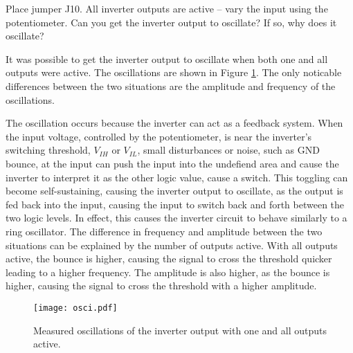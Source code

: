 \documentclass[../main.tex]{subfiles}
\begin{document}
\vspace{10pt}

Place jumper J10. All inverter outputs are active – vary the input using the potentiometer. Can you get the inverter output to oscillate? If so, why does it oscillate?

\solution

It was possible to get the inverter output to oscillate when both one and all outputs were active. The oscillations are shown in Figure \ref{fig:inverter_oscillation}. The only noticable differences between the two situations are the amplitude and frequency of the oscillations.

The oscillation occurs because the inverter can act as a feedback system. When the input voltage, controlled by the potentiometer, is near the inverter's switching threshold, $V_{IH}$ or $V_{IL}$, small disturbances or noise, such as GND bounce, at the input can push the input into the undefiend area and cause the inverter to interpret it as the other logic value, cause a switch. This toggling can become self-sustaining, causing the inverter output to oscillate, as the output is fed back into the input, causing the input to switch back and forth between the two logic levels. In effect, this causes the inverter circuit to behave similarly to a ring oscillator. The difference in frequency and amplitude between the two situations can be explained by the number of outputs active. With all outputs active, the bounce is higher, causing the signal to cross the threshold quicker leading to a higher frequency. The amplitude is also higher, as the bounce is higher, causing the signal to cross the threshold with a higher amplitude.

\begin{figure}[H]
    \centering
    \texttt{[image: osci.pdf]}
    \caption{Measured oscillations of the inverter output with one and all outputs active.}
    \label{fig:inverter_oscillation}
\end{figure}
\end{document}
